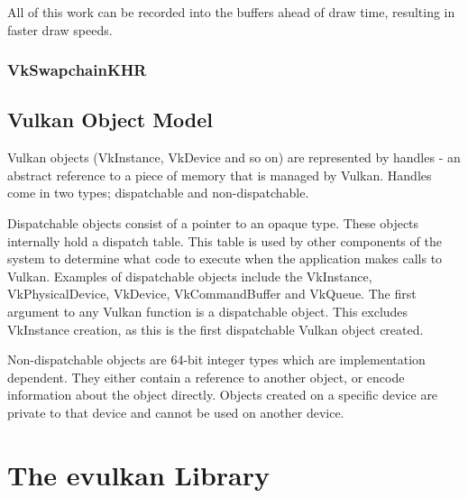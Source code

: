 \documentclass[12pt]{report}
\theoremstyle{definition}
\begin{document}
        All of this work can be recorded into the buffers ahead of draw time,
        resulting in faster draw speeds.

      \subsection{VkSwapchainKHR}


    \section{Vulkan Object Model}

      Vulkan objects (VkInstance, VkDevice and so on) are represented by
      handles - an abstract reference to a piece of memory that is managed by
      Vulkan. Handles come in two types; dispatchable and non-dispatchable.

      Dispatchable objects consist of a pointer to an opaque type. These
      objects internally hold a dispatch table. This table is used by other
      components of the system to determine what code to execute when the
      application makes calls to Vulkan. Examples of dispatchable objects
      include the VkInstance, VkPhysicalDevice, VkDevice, VkCommandBuffer
      and VkQueue. The first argument to any Vulkan function is a
      dispatchable object. This excludes VkInstance creation, as this
      is the first dispatchable Vulkan object created.

      Non-dispatchable objects are 64-bit integer types which are
      implementation dependent. They either contain a reference to another
      object, or encode information about the object directly. Objects
      created on a specific device are private to that device and cannot
      be used on another device.

  \chapter{The evulkan Library}

  \lipsum[1]
\end{document}

